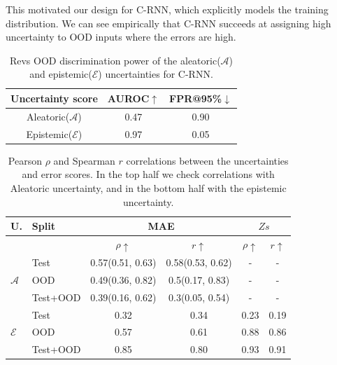 This motivated our design for C-RNN, which explicitly models the training distribution. We can see empirically that C-RNN succeeds at assigning high uncertainty to OOD inputs where the errors are high.   


\begin{table}[htbp]
\centering
    \begin{tabular}{c  c  c}  
        \toprule
        Uncertainty score & AUROC$\uparrow$ & FPR@95\%$\downarrow$\\
        \midrule
        Aleatoric($\mathcal{A}$) & 0.47  & 0.90\\
        Epistemic($\mathcal{E}$) & 0.97 &  0.05 \\
        \midrule
    \end{tabular}
    \caption[Revs OOD discrimination power for C-RNN]{Revs OOD discrimination power of the aleatoric($\mathcal{A}$) and epistemic($\mathcal{E}$) uncertainties for C-RNN.}
    \label{tbl:revs_discrimination}
\end{table}


\begin{table}[htbp]
\centering
    \begin{tabular}{l l c c c c}  
        \toprule
        U. & Split & \multicolumn{2}{c}{MAE} & \multicolumn{2}{c}{$Zs$}\\
        \midrule
        & & $\rho \uparrow$ & $r \uparrow$ & $\rho \uparrow$ & $r \uparrow$ \\
        \multirow{3}{*}{$\mathcal{A}$} 
            & Test     & 0.57(0.51, 0.63) & 0.58(0.53, 0.62) & - & - \\  
            & OOD      & 0.49(0.36, 0.82) & 0.5(0.17, 0.83) & - & - \\  
            & Test+OOD & 0.39(0.16, 0.62) & 0.3(0.05, 0.54) & - & - \\ 

        \midrule
        \multirow{3}{*}{$\mathcal{E}$} 
            & Test     & 0.32  & 0.34 &  0.23  & 0.19 \\  
            & OOD      & 0.57 & 0.61 &  0.88 & 0.86 \\
            & Test+OOD & 0.85 & 0.80 &  0.93 & 0.91 \\ 

        \toprule
    \end{tabular}
    \caption[Revs uncertainty-error correlations for C-RNN]{Pearson $\rho$ and Spearman $r$ correlations between the uncertainties and error scores. In the top half we check correlations with Aleatoric uncertainty, and in the bottom half with the epistemic uncertainty.}
    \label{tbl:revs_corr}
\end{table}


